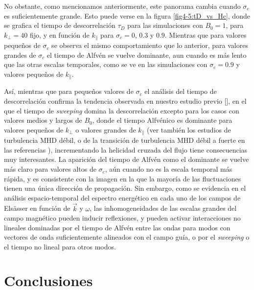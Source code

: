 No obstante, como mencionamos anteriormente, este panorama cambia
cuando $\sigma_c$ es suficientemente grande. Esto puede verse en la
figura \cref{fig4-5:tD_vs_Hc}, donde se grafica el tiempo de
descorrelación $\tau_D$ para las simulaciones con $B_0=1$, para
$k_\perp=40$ fijo, y en función de $k_\parallel$ para $\sigma_c = 0$,
$0.3$ y $0.9$. Mientras que para valores pequeños de $\sigma_c$ se
observa el mismo comportamiento que lo anterior, para valores grandes
de $\sigma_c$ el tiempo de Alfvén se vuelve dominante, aun cuando es
más lento que las otras escalas temporales, como se ve en las
simulaciones con $\sigma_c=0.9$ y valores pequeños de $k_\parallel$.

Así, mientras que para pequeños valores de $\sigma_c$ el análisis del
tiempo de descorrelación confirma la tendencia observada en nuestro
estudio previo [\cite{lugones_2016_spatiotemporal}], en el que el tiempo
de \textit{sweeping} domina la descorrelación excepto para los casos con
valores medios y largos de $B_0$, donde el tiempo Alfvénico es
dominante para valores pequeños de $k_{\perp}$ o valores grandes de
$k_{\parallel}$ (ver también los estudios de turbulencia MHD débil, o
de la transición de turbulencia MHD débil a fuerte en las referencias
\cite{meyrand_weak_2015, lugones_2016_spatiotemporal,
  meyrand_direct_2016}), incrementando la helicidad cruzada del flujo
tiene consecuencias muy interesantes.  La aparición del tiempo de
Alfvén como el dominante se vuelve más claro para valores altos de
$\sigma_c$, aún cuando no es la escala temporal más rápida, y es
consistente con la imagen en la que la mayoría de las fluctuaciones
tienen una única dirección de propagación.  Sin embargo, como se
evidencia en el análisis espacio-temporal del espectro energético en
cada uno de los campos de Els\"asser en función de $\vec{k}$ y
$\omega$, las inhomogeneidades de las escalas grandes del campo
magnético pueden inducir reflexiones, y pueden activar interacciones
no lineales dominadas por el tiempo de Alfv\'en entre las ondas para
modos con vectores de onda suficientemente alineados con el campo
guía, o por el \textit{sweeping} o el tiempo no lineal para otros
modos.

\section{Conclusiones}\label{sec4:Conclusions}

